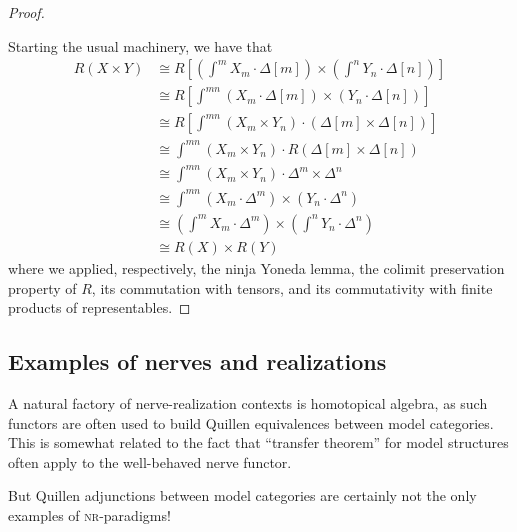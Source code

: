 \begin{proof}
\begin{itemize}
\end{itemize}
Starting the usual machinery, we have that
\begin{align*}
R( X\times  Y) &\cong \textstyle R\left[ \left(\int^m X_m\cdot \Delta[m] \right )\times \left( \int^n Y_n\cdot \Delta[n]\right ) \right ]\\
&\cong\textstyle R\left[ \int^{mn} (X_m\cdot \Delta[m])\times (Y_n\cdot \Delta[n])\right]\\
&\cong\textstyle R\left[\int^{mn} (X_m\times Y_n)\cdot (\Delta[m]\times \Delta[n]) \right ]\\
&\cong\textstyle \int^{mn}(X_m\times Y_n)\cdot R(\Delta[m]\times \Delta[n])\\
&\cong\textstyle \int^{mn}(X_m\times Y_n)\cdot \Delta^m\times\Delta^n \\
&\cong\textstyle \int^{mn} (X_m\cdot\Delta^m)\times (Y_n\cdot \Delta^n)\\
&\cong\textstyle \left(\int^mX_m\cdot\Delta^m\right)\times \left(\int^n Y_n\cdot \Delta^n \right )\\
&\cong  R( X)\times R( Y)
\end{align*}
where we applied, respectively, the ninja Yoneda lemma, the colimit preservation property of $R$, its commutation with tensors, and its commutativity with finite products of representables.
\end{proof}
\subsection{Examples of nerves and realizations}
A natural factory of nerve\hyp{}realization contexts is homotopical algebra, as such functors are often used to build Quillen equivalences between model categories. This is somewhat related to the fact that ``transfer theorem'' for model structures often apply to the well-behaved nerve functor.

But Quillen adjunctions between model categories are certainly not the only examples of \textsc{nr}-paradigms!

